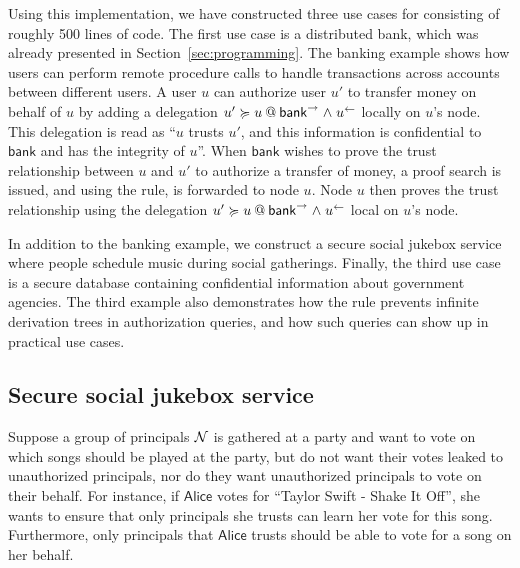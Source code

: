 Using this implementation, we have constructed three use cases for \lang{} consisting of roughly 500 lines of code. The first use case is a distributed bank, which was already presented in Section~\ref{sec:programming}. The banking example shows how users can perform remote procedure calls to handle transactions across accounts between different users. A user $u$ can authorize user $u'$ to transfer money on behalf of $u$ by adding a delegation $\lb{\conf{\mathsf{bank}} \conj \integ{u}}{u' \actsfor u}$ locally on $u$'s node. This delegation is read as ``$u$ trusts $u'$, and this information is confidential to $\mathsf{bank}$ and has the integrity of $u$''. When $\mathsf{bank}$ wishes to prove the trust relationship between $u$ and $u'$ to authorize a transfer of money, a proof search is issued, and using the  rule, is forwarded to node $u$. Node $u$ then proves the trust relationship using the delegation $\lb{\conf{\mathsf{bank}} \conj \integ{u}}{u' \actsfor u}$ local on $u$'s node.

In addition to the banking example, we construct a secure social jukebox service where people schedule music during social gatherings. Finally, the third use case is a secure database containing confidential information about government agencies. The third example also demonstrates how the  rule prevents infinite derivation trees in authorization queries, and how such queries can show up in practical use cases.

\subsection{Secure social jukebox service}\label{subsec:jukebox}
Suppose a group of principals $\Nameset$ is gathered at a party and want to vote on which songs should be played at the party, but do not want their votes leaked to unauthorized principals, nor do they want unauthorized principals to vote on their behalf.
For instance, if $\mathsf{Alice}$ votes for ``Taylor Swift - Shake It Off'', she wants to ensure that only principals she trusts can learn her vote for this song. Furthermore, only principals that $\mathsf{Alice}$ trusts should be able to vote for a song on her behalf.

